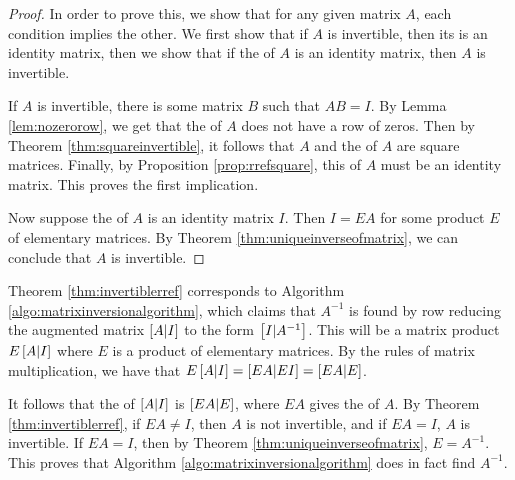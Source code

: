 \begin{proof}
In order to prove this, we show that for any given matrix $A$, each condition implies the other. We first show that if $A$ is invertible, then its {\rref} is an identity matrix, then we show that if the {\rref} of $A$ is an identity matrix, then $A$ is invertible. 

If $A$ is invertible, there is some matrix $B$ such that $AB = I$. By Lemma \ref{lem:nozerorow}, we get that the {\rref} of $A$ does not have a row of zeros. Then by Theorem \ref{thm:squareinvertible}, it follows that $A$ and the {\rref} of $A$ are square matrices. Finally, by Proposition \ref{prop:rrefsquare}, this {\rref} of $A$ must be an identity matrix. This proves the first implication.

Now suppose the {\rref} of $A$ is an identity matrix $I$. Then $I=EA$ for some product $E$ of elementary matrices. By Theorem \ref{thm:uniqueinverseofmatrix}, we can conclude that $A$ is invertible.
\end{proof}

Theorem \ref{thm:invertiblerref} corresponds to Algorithm \ref{algo:matrixinversionalgorithm}, which claims that $A^{-1}$ is found by row reducing the augmented matrix $\left[ A|I\right]$ to the form $\left[ I|A^{-1}\right]$. This will be a matrix product $E\left[ A|I\right]$ where $E$ is a product of elementary matrices. By the rules of matrix multiplication, we have that $E\left[ A|I\right] = \left[ EA|EI\right] = \left[ EA|E\right]$.

It follows that the {\rref} of $\left[ A|I\right]$ is $\left[ EA|E\right]$, where $EA$ gives the {\rref} of $A$. By Theorem \ref{thm:invertiblerref}, if $EA \neq I$, then $A$ is not invertible, and if $EA=I$, $A$ is invertible. If $EA=I$, then by Theorem \ref{thm:uniqueinverseofmatrix}, $E=A^{-1}$. This proves that Algorithm \ref{algo:matrixinversionalgorithm} does in fact find $A^{-1}$.
